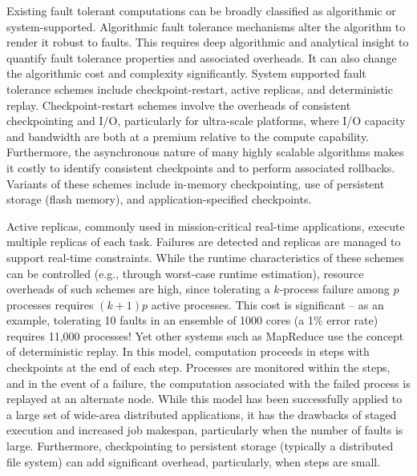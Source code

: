 \documentclass[11pt]{article}
\begin{document}
Existing fault tolerant computations can be broadly classified as algorithmic or
system-supported. Algorithmic fault tolerance mechanisms alter the algorithm to
render it robust to faults. This requires deep algorithmic and analytical insight to
quantify fault tolerance properties and associated overheads. It can also
change the algorithmic cost and complexity significantly. System supported fault tolerance 
schemes include checkpoint-restart, active replicas, and deterministic replay.
Checkpoint-restart schemes involve the overheads of consistent checkpointing and I/O,
particularly for ultra-scale platforms, where I/O capacity and bandwidth are both at
a premium relative to the compute capability. Furthermore, the asynchronous nature of many
highly scalable algorithms makes it costly to identify consistent checkpoints and to
perform associated rollbacks. Variants of these schemes include in-memory checkpointing,
use of persistent storage (flash memory), and application-specified checkpoints.

Active replicas, commonly used in mission-critical real-time applications,
execute multiple replicas of each task. Failures are detected and replicas are
managed to support real-time constraints. While the runtime characteristics of
these schemes can be controlled (e.g., through worst-case runtime estimation), resource
overheads of such schemes are high, since tolerating a $k$-process failure
among $p$ processes requires $(k+1)p$ active processes. This cost is significant --
as an example, tolerating 10 faults in an ensemble of 1000 cores (a 1\% error rate)
requires 11,000 processes! Yet other systems such as MapReduce use the concept of
deterministic replay. In this model, computation proceeds in steps with checkpoints
at the end of each step. Processes are monitored within the steps, and in the event
of a failure, the computation associated with the failed process is replayed at an
alternate node. While this model has been successfully applied to a large set of
wide-area distributed applications, it has the drawbacks of staged execution and
increased job makespan, particularly when the number of faults is large. Furthermore,
checkpointing to persistent storage (typically a distributed file system) can add
significant overhead, particularly, when steps are small.
\end{document}
